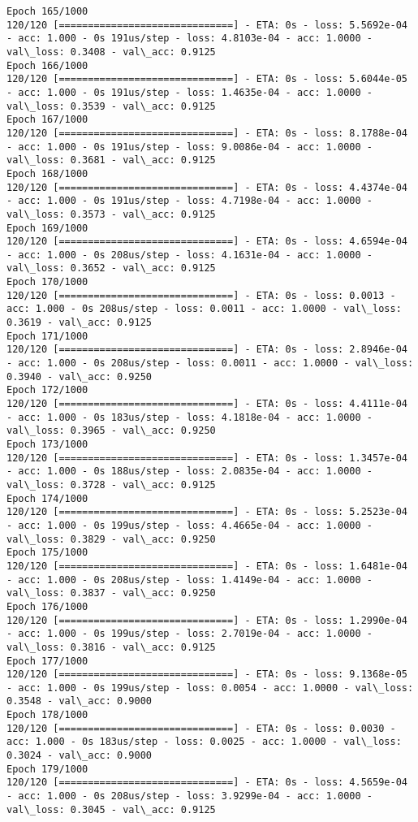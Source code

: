 \documentclass[11pt]{article}
\begin{document}
\begin{Verbatim}[commandchars=\\\{\}]
Epoch 165/1000
120/120 [==============================] - ETA: 0s - loss: 5.5692e-04 - acc: 1.000 - 0s 191us/step - loss: 4.8103e-04 - acc: 1.0000 - val\_loss: 0.3408 - val\_acc: 0.9125
Epoch 166/1000
120/120 [==============================] - ETA: 0s - loss: 5.6044e-05 - acc: 1.000 - 0s 191us/step - loss: 1.4635e-04 - acc: 1.0000 - val\_loss: 0.3539 - val\_acc: 0.9125
Epoch 167/1000
120/120 [==============================] - ETA: 0s - loss: 8.1788e-04 - acc: 1.000 - 0s 191us/step - loss: 9.0086e-04 - acc: 1.0000 - val\_loss: 0.3681 - val\_acc: 0.9125
Epoch 168/1000
120/120 [==============================] - ETA: 0s - loss: 4.4374e-04 - acc: 1.000 - 0s 191us/step - loss: 4.7198e-04 - acc: 1.0000 - val\_loss: 0.3573 - val\_acc: 0.9125
Epoch 169/1000
120/120 [==============================] - ETA: 0s - loss: 4.6594e-04 - acc: 1.000 - 0s 208us/step - loss: 4.1631e-04 - acc: 1.0000 - val\_loss: 0.3652 - val\_acc: 0.9125
Epoch 170/1000
120/120 [==============================] - ETA: 0s - loss: 0.0013 - acc: 1.000 - 0s 208us/step - loss: 0.0011 - acc: 1.0000 - val\_loss: 0.3619 - val\_acc: 0.9125
Epoch 171/1000
120/120 [==============================] - ETA: 0s - loss: 2.8946e-04 - acc: 1.000 - 0s 208us/step - loss: 0.0011 - acc: 1.0000 - val\_loss: 0.3940 - val\_acc: 0.9250
Epoch 172/1000
120/120 [==============================] - ETA: 0s - loss: 4.4111e-04 - acc: 1.000 - 0s 183us/step - loss: 4.1818e-04 - acc: 1.0000 - val\_loss: 0.3965 - val\_acc: 0.9250
Epoch 173/1000
120/120 [==============================] - ETA: 0s - loss: 1.3457e-04 - acc: 1.000 - 0s 188us/step - loss: 2.0835e-04 - acc: 1.0000 - val\_loss: 0.3728 - val\_acc: 0.9125
Epoch 174/1000
120/120 [==============================] - ETA: 0s - loss: 5.2523e-04 - acc: 1.000 - 0s 199us/step - loss: 4.4665e-04 - acc: 1.0000 - val\_loss: 0.3829 - val\_acc: 0.9250
Epoch 175/1000
120/120 [==============================] - ETA: 0s - loss: 1.6481e-04 - acc: 1.000 - 0s 208us/step - loss: 1.4149e-04 - acc: 1.0000 - val\_loss: 0.3837 - val\_acc: 0.9250
Epoch 176/1000
120/120 [==============================] - ETA: 0s - loss: 1.2990e-04 - acc: 1.000 - 0s 199us/step - loss: 2.7019e-04 - acc: 1.0000 - val\_loss: 0.3816 - val\_acc: 0.9125
Epoch 177/1000
120/120 [==============================] - ETA: 0s - loss: 9.1368e-05 - acc: 1.000 - 0s 199us/step - loss: 0.0054 - acc: 1.0000 - val\_loss: 0.3548 - val\_acc: 0.9000
Epoch 178/1000
120/120 [==============================] - ETA: 0s - loss: 0.0030 - acc: 1.000 - 0s 183us/step - loss: 0.0025 - acc: 1.0000 - val\_loss: 0.3024 - val\_acc: 0.9000
Epoch 179/1000
120/120 [==============================] - ETA: 0s - loss: 4.5659e-04 - acc: 1.000 - 0s 208us/step - loss: 3.9299e-04 - acc: 1.0000 - val\_loss: 0.3045 - val\_acc: 0.9125

\end{Verbatim}
\end{document}

